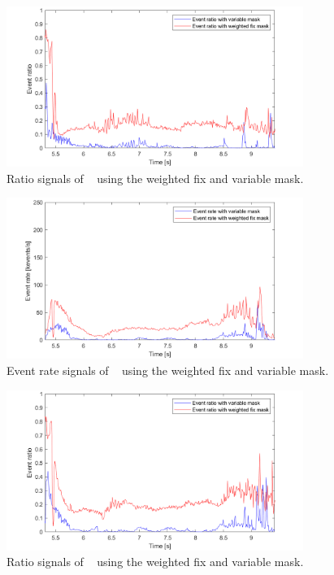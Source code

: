 \begin{figure}[H]
    \centering
    \includegraphics[width=0.86\textwidth]{resources/images/var_mask_hb2_no_slip_rat}
    \caption{Ratio signals of ~ using the weighted fix and variable mask.}\label{fig:var_mask_hb2_no_slip_rat}
\end{figure}

\begin{figure}[H]
    \centering
    \includegraphics[width=0.86\textwidth]{resources/images/var_mask_hb2_slip_evr}
    \caption{Event rate signals of ~ using the weighted fix and variable mask.}\label{fig:var_mask_hb2_slip_evr}
\end{figure}

\begin{figure}[H]
    \centering
    \includegraphics[width=0.86\textwidth]{resources/images/var_mask_hb2_slip_rat}
    \caption{Ratio signals of ~ using the weighted fix and variable mask.}\label{fig:var_mask_hb2_slip_rat}
\end{figure}

